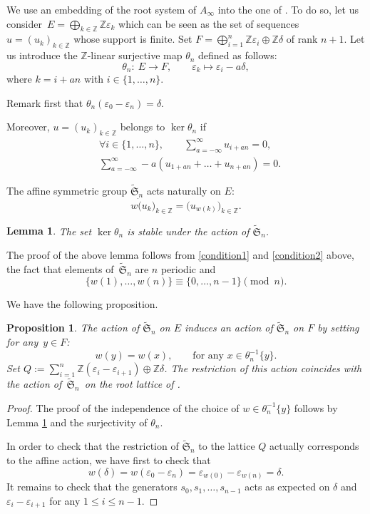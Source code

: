 \documentclass[10pt,a4paper]{amsart}
\newtheorem{Lemma}[Theorem]{Lemma}
\newtheorem{Proposition}[Theorem]{Proposition}
 { \theoremstyle{definition}
\newtheorem{Definition}[Theorem]{Definition}
\newtheorem{Note}[Theorem]{Note}
\newtheorem{Example}[Theorem]{Example}
\newtheorem{Remark}[Theorem]{Remark} }
\numberwithin{equation}{section}
\newcommand{\Z}{\mathbb{Z}}
\begin{document}
We use an embedding of the root system of $A_\infty$ into the one of . To do so, let us consider~${E=\bigoplus_{k\in\Z} \Z\varepsilon_k}$ which can be seen as the set of sequences $u=(u_k)_{k\in\Z}$ whose support is finite. Set $F=\bigoplus_{i=1}^n \Z\varepsilon_i\oplus \Z\delta$ of rank $n+1$. Let us introduce the $\Z$-linear surjective map $\theta_n$ defined as follows:
\[
\theta_n\colon \ E   \to   F,\qquad
\varepsilon_k  \mapsto  \varepsilon_i-a\delta ,
\]
where $k=i+an$ with $i\in\lbrace 1,\dots,n\rbrace$.

Remark first that $\theta_n(\varepsilon_0-\varepsilon_n)=\delta$.

Moreover, $u=(u_k)_{k\in\Z}$ belongs to $\ker \theta_n$ if
\begin{align}
&\forall i\in\lbrace 1,\dots,n\rbrace,\qquad\sum_{a=-\infty}^{\infty} u_{i+an}=0,\label{condition1}\\
&\sum_{a=-\infty}^{\infty} -a(u_{1+an}+\dots+u_{n+an})=0.\label{condition2}
\end{align}

The affine symmetric group $\widetilde{\mathfrak{S}}_{n}$ acts naturally on $E$:
\[w\dot (u_k)_{k\in\Z}=\bigl(u_{w(k)}\bigr)_{k\in\Z}.\]
\begin{Lemma}\label{lem:stability}
The set $\ker \theta_n$ is stable under the action of $\widetilde{\mathfrak{S}}_{n}$.
\end{Lemma}
The proof of the above lemma follows from \eqref{condition1} and \eqref{condition2} above, the fact that elements of~$\widetilde{\mathfrak{S}}_{n}$ are $n$ periodic and
\[\lbrace w(1),\dots ,w(n)\rbrace\equiv\lbrace 0,\dots,n-1\rbrace\pmod{n}.\]


We have the following proposition.

\begin{Proposition}%
The action of $\widetilde{\mathfrak{S}}_{n}$ on $E$ induces an action of $\widetilde{\mathfrak{S}}_{n}$ on $F$ by setting for any~$y\in F$:
\[w(y)=w(x), \qquad\text{for any } x\in \theta_n^{-1}\lbrace y\rbrace.\]
Set $Q:=\sum_{i=1}^{n}\Z(\varepsilon_i-\varepsilon_{i+1})\oplus\Z\delta$. The restriction of this action coincides with the action of~$\widetilde{\mathfrak{S}}_{n}$~on the root lattice of .
\end{Proposition}
\begin{proof}
The proof of the independence of the choice of $w\in\theta_n^{-1}\lbrace y\rbrace$ follows by Lemma \ref{lem:stability} and the surjectivity of $\theta_n$.

In order to check that the restriction of $\widetilde{\mathfrak{S}}_{n}$ to the lattice $Q$ actually corresponds to the affine action, we have first to check that
\[ w(\delta)=w(\varepsilon_0-\varepsilon_n)=\varepsilon_{w(0)}-\varepsilon_{w(n)}=\delta.\]
It remains to check that the generators $s_0,s_1,\dots,s_{n-1}$ acts as expected on $\delta$ and $\varepsilon_i-\varepsilon_{i+1}$ for any $1\leq i\leq n-1$.
\end{proof}
\end{document}

